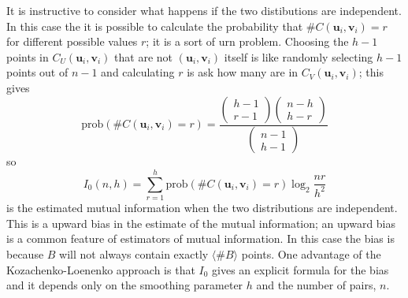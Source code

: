 \documentclass[12pt]{article}
\renewcommand{\u}{\mathbf{u}}
\renewcommand{\v}{\mathbf{v}}
\begin{document}
It is instructive to consider what happens if the two distibutions are
independent. In this case the it is possible to calculate the
probability that $\#C(\u_i,\v_i)=r$ for different possible values $r$;
it is a sort of urn problem. Choosing the $h-1$ points in $C_U(\u_i,\v_i)$ that are not $(\u_i,\v_i)$ itself
is like randomly selecting $h-1$ points out of $n-1$ and calculating $r$ is ask how many
are in $C_V(\u_i,\v_i)$; this gives
\begin{equation}
\mbox{prob}\left(\#C(\u_i,\v_i)=r\right)=\frac{\left(\begin{array}{c}h-1\\r-1\end{array}\right)
\left(\begin{array}{c}n-h\\h-r\end{array}\right)}{\left(\begin{array}{c}n-1\\h-1\end{array}\right)}
\end{equation}
so
\begin{equation}
I_0(n,h)=\sum_{r=1}^h \mbox{prob}\left(\#C(\u_i,\v_i)=r\right) \log_2{\frac{nr}{h^2}}
\end{equation}
is the estimated mutual information when the two distributions are
independent. This is a upward bias in the estimate of the mutual
information; an upward bias is a common feature of estimators of
mutual information. In this case the bias is because $B$ will not
always contain exactly $\langle \#B\rangle$ points. One advantage of
the Kozachenko-Loenenko approach is that $I_0$ gives an explicit
formula for the bias and it depends only on the smoothing parameter
$h$ and the number of pairs, $n$.
\end{document}
